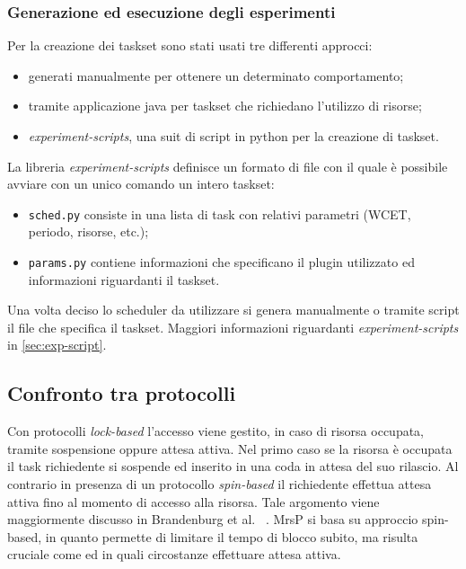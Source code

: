 \subsubsection{Generazione ed esecuzione degli esperimenti}

\noindent Per la creazione dei taskset sono stati usati tre differenti approcci:

\begin{itemize}
	\item generati manualmente per ottenere un determinato comportamento;
	\item tramite applicazione java per taskset che richiedano l'utilizzo di risorse;
	\item \textit{experiment-scripts}, una suit di script in python per la creazione di taskset.
\end{itemize}

\noindent La libreria \textit{experiment-scripts} definisce un formato di file con il quale è possibile avviare con un unico comando un intero taskset:

\begin{itemize}
  \item \texttt{sched.py} consiste in una lista di task con relativi parametri (WCET, periodo, risorse, etc.);
  \item \texttt{params.py} contiene informazioni che specificano il plugin utilizzato ed informazioni riguardanti il taskset.
\end{itemize}

\noindent Una volta deciso lo scheduler da utilizzare si genera manualmente o tramite script il file che specifica il taskset. Maggiori informazioni riguardanti \textit{experiment-scripts} in \ref{sec:exp-script}.\\

\newpage

\subsection{Confronto tra protocolli}
\label{sec:confronto_protocolli}

\noindent Con protocolli \textit{lock-based} l'accesso viene gestito, in caso di risorsa occupata, tramite sospensione oppure attesa attiva. Nel primo caso se la risorsa è occupata il task richiedente si sospende ed inserito in una coda in attesa del suo rilascio. Al contrario in presenza di un protocollo \textit{spin-based} il richiedente effettua attesa attiva fino al momento di accesso alla risorsa. Tale argomento viene maggiormente discusso in Brandenburg et al. ~\cite{Brandenburg:2008:RSM:1440456.1440601}. MrsP si basa su approccio spin-based, in quanto permette di limitare il tempo di blocco subito, ma risulta cruciale come ed in quali circostanze effettuare attesa attiva.\\


